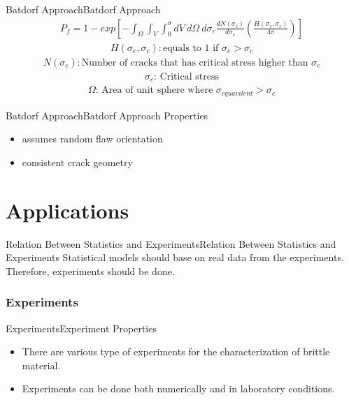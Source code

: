 \documentclass{beamer}
\begin{document}
\begin{frame}{Batdorf Approach}{Batdorf Approach}
\begin{eqnarray*}
P_f=1-exp\left[-\int_\Omega \int_V \int_{0}^{\sigma} dV \ d\Omega \ d\sigma_c \frac{dN\left(\sigma_c\right)}{d\sigma_c}\left(\frac{H\left(\sigma_e,\sigma_c\right)}{4 \pi}\right)\right]
\end{eqnarray*}
\begin{eqnarray*}
H\left(\sigma_e,\sigma_c\right) :\text{equals to 1 if } \sigma_e>\sigma_c
\end{eqnarray*}
\begin{eqnarray*}
N\left(\sigma_c\right) :\text{Number of cracks that has critical stress higher than } \sigma_c
\end{eqnarray*}
\begin{eqnarray*}
\sigma_c \text{: Critical stress}
\end{eqnarray*}
\begin{eqnarray*}
\Omega \text{: Area of unit sphere where } \sigma_{equavilent}>\sigma_c
\end{eqnarray*}
\end{frame}

\begin{frame}{Batdorf Approach}{Batdorf Approach}
Properties
\begin{itemize}
\item assumes random flaw orientation
\item consistent crack geometry
\end{itemize}
\end{frame}

\section{Applications}
\begin{frame}{Relation Between Statistics and Experiments}{Relation Between Statistics and Experiments}
Statistical models should base on real data from the experiments. Therefore, experiments should be done.
\end{frame}

\subsubsection{Experiments}
\begin{frame}{Experiments}{Experiment Properties}
\begin{itemize}
\item There are various type of experiments for the characterization of brittle material.
\item Experiments can be done both numerically and in laboratory conditions.
\end{itemize}
\end{frame}
\end{document}
